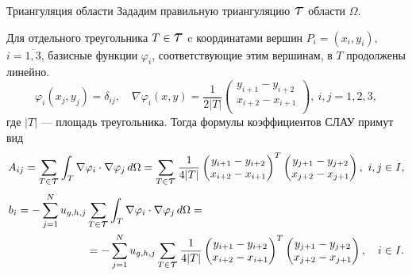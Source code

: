 \documentclass[ignoreonframetext,xcolor=table, unicode, 10pt]{beamer}
\renewcommand{\phi}{\varphi}
\newcommand\Tau{\scalerel*{\tau}{T}}
\begin{document}
\begin{frame}{Триангуляция области}
	Зададим правильную триангуляцию $\Tau$ области $\Omega$.
	
	Для отдельного треугольника $T \in \Tau$ c координатами вершин $P_i = (x_i, y_i),$ $i=\overline{1,3}$, базисные функции $\phi_i$, соответствующие этим вершинам, в $T$ продолжены линейно.
	\begin{equation*}
		\phi_i(x_j, y_j) = \delta_{ij}, \quad 
		\nabla \phi_{i}(x,y) = \dfrac{1}{2 |T|} 
		\begin{pmatrix}
			y_{i+1} - y_{i+2} \\
			x_{i+2} - x_{i+1} \\
		\end{pmatrix}, \ i,j = 1,2,3,
	\end{equation*}
	где $|T|$ --- площадь треугольника. Тогда формулы коэффициентов СЛАУ примут вид	
	\begin{equation*}
		A_{ij} = \sum_{T \in \Tau}\int_{T} \nabla \phi_i \cdot \nabla \phi_j \, d\Omega 
		= \sum_{T \in \Tau} \dfrac{1}{4 |T|} 
		\begin{pmatrix}
			y_{i+1} - y_{i+2}\\
			x_{i+2} - x_{i+1}\\
		\end{pmatrix}^T
		\begin{pmatrix}
			y_{j+1} - y_{j+2}\\
			x_{j+2} - x_{j+1}\\
		\end{pmatrix},
		\  i, j\in I,
	\end{equation*}
	\begin{equation*}
		\begin{aligned}
			b_i = - \sum_{j=1}^{N} u_{g,h, j} & \sum_{T \in \Tau} \int_{T} \nabla \phi_i  \cdot \nabla \phi_j \, d\Omega = \\
			& = - \sum_{j=1}^{N} u_{g,h, j}  \sum_{T \in \Tau} \dfrac{1}{4 |T|} 
			\begin{pmatrix}
				y_{i+1} - y_{i+2}\\
				x_{i+2} - x_{i+1}\\
			\end{pmatrix}^T
			\begin{pmatrix}
				y_{j+1} - y_{j+2}\\
				x_{j+2} - x_{j+1}\\
			\end{pmatrix},
			\quad i \in I.
		\end{aligned}		
	\end{equation*}
	\normalsize
\end{frame}
\end{document}

